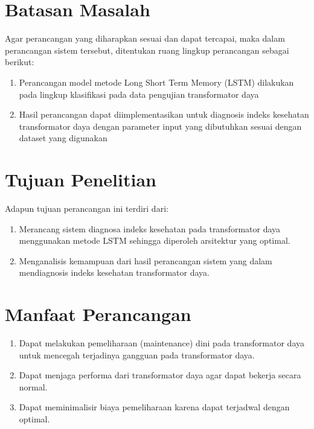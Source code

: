 \section{Batasan Masalah}
Agar perancangan yang diharapkan sesuai dan dapat tercapai, maka dalam perancangan sistem tersebut, ditentukan ruang lingkup perancangan sebagai berikut:
\begin{enumerate}
	\item Perancangan model metode Long Short Term Memory (LSTM) dilakukan pada lingkup klasifikasi pada data pengujian transformator daya
	\item Hasil perancangan dapat diimplementasikan untuk diagnosis indeks kesehatan transformator daya dengan parameter input yang dibutuhkan sesuai dengan dataset yang digunakan
\end{enumerate}

\section{Tujuan Penelitian}
Adapun tujuan perancangan ini terdiri dari:
\begin{enumerate}
	\item Merancang sistem diagnosa indeks kesehatan pada transformator daya menggunakan metode LSTM sehingga diperoleh arsitektur yang optimal.
	\item Menganalisis kemampuan dari hasil perancangan sistem yang dalam mendiagnosis indeks kesehatan transformator daya.
\end{enumerate}


\section{Manfaat Perancangan}
\begin{enumerate}
	\item Dapat melakukan pemeliharaan (maintenance) dini pada transformator daya untuk mencegah terjadinya gangguan pada transformator daya.
	\item Dapat menjaga performa dari transformator daya agar dapat bekerja secara normal.
	\item Dapat meminimalisir biaya pemeliharaan karena dapat terjadwal dengan optimal.
\end{enumerate}

